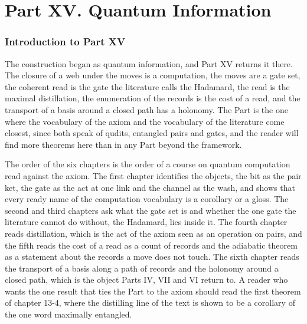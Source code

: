 \clearpage
\part*{Part XV. Quantum Information}
\label{atlaspart:15-quantum-information}
\section*{Introduction to Part XV}\label{narr:part:XIII}
The construction began as quantum information, and Part XV returns it there. The closure of a web under the moves is a computation, the moves are a gate set, the coherent read is the gate the literature calls the Hadamard, the read is the maximal distillation, the enumeration of the records is the cost of a read, and the transport of a basis around a closed path has a holonomy. The Part is the one where the vocabulary of the axiom and the vocabulary of the literature come closest, since both speak of qudits, entangled pairs and gates, and the reader will find more theorems here than in any Part beyond the framework.

The order of the six chapters is the order of a course on quantum computation read against the axiom. The first chapter identifies the objects, the bit as the pair ket, the gate as the act at one link and the channel as the wash, and shows that every ready name of the computation vocabulary is a corollary or a gloss. The second and third chapters ask what the gate set is and whether the one gate the literature cannot do without, the Hadamard, lies inside it. The fourth chapter reads distillation, which is the act of the axiom seen as an operation on pairs, and the fifth reads the cost of a read as a count of records and the adiabatic theorem as a statement about the records a move does not touch. The sixth chapter reads the transport of a basis along a path of records and the holonomy around a closed path, which is the object Parts IV, VII and VI return to. A reader who wants the one result that ties the Part to the axiom should read the first theorem of chapter 13-4, where the distilling line of the text is shown to be a corollary of the one word maximally entangled.

